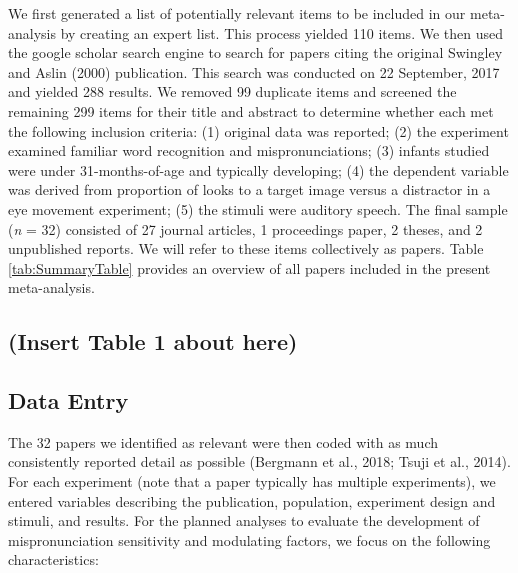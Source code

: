 \documentclass[man]{apa6}
\begin{document}
We first generated a list of potentially relevant items to be included in our meta-analysis by creating an expert list. This process yielded 110 items. We then used the google scholar search engine to search for papers citing the original Swingley and Aslin (2000) publication. This search was conducted on 22 September, 2017 and yielded 288 results. We removed 99 duplicate items and screened the remaining 299 items for their title and abstract to determine whether each met the following inclusion criteria: (1) original data was reported; (2) the experiment examined familiar word recognition and mispronunciations; (3) infants studied were under 31-months-of-age and typically developing; (4) the dependent variable was derived from proportion of looks to a target image versus a distractor in a eye movement experiment; (5) the stimuli were auditory speech. The final sample (\emph{n} = 32) consisted of 27 journal articles, 1 proceedings paper, 2 theses, and 2 unpublished reports. We will refer to these items collectively as papers. Table \ref{tab:SummaryTable} provides an overview of all papers included in the present meta-analysis.

\hypertarget{insert-table-1-about-here}{%
\subsection{(Insert Table 1 about here)}\label{insert-table-1-about-here}}

\hypertarget{data-entry}{%
\subsection{Data Entry}\label{data-entry}}

The 32 papers we identified as relevant were then coded with as much consistently reported detail as possible (Bergmann et al., 2018; Tsuji et al., 2014). For each experiment (note that a paper typically has multiple experiments), we entered variables describing the publication, population, experiment design and stimuli, and results. For the planned analyses to evaluate the development of mispronunciation sensitivity and modulating factors, we focus on the following characteristics:
\end{document}
